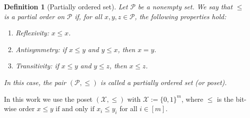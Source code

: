 \documentclass[onecolumn]{IEEEtran} %
\newcommand{\bP}{\mathbf P}
\newcommand{\bI}{\mathbf I}
\newcommand{\1}{\mathbbm{1}}
\DeclareMathOperator{\Aut}{Aut}
\theoremstyle{boldremark}
\newtheorem{definition}{Definition}
\newcommand{\bT}{\mathbf{T}}
\begin{document}


\begin{definition}[Partially ordered set]\label{Def_POSET}
Let $\mathcal{P}$ be a nonempty set. We say that $\le$ is a \emph{partial order} on $\mathcal{P}$
if, for all $x,y,z\in\mathcal{P}$, the following properties hold:
\begin{enumerate}
  \item {Reflexivity:} $x \le x$.
  \item {Antisymmetry:} if $x \le y$ and $y \le x$, then $x = y$.
  \item {Transitivity:} if $x \le y$ and $y \le z$, then $x \le z$.
\end{enumerate}
In this case, the pair $(\mathcal{P},\le)$ is called a partially ordered set
(or \emph{poset}).
\end{definition}
In this work we use the poset $(\mathcal{X},\le)$ with
$\mathcal{X} := \{0,1\}^m$, where $\le$ is the bit-wise order
$x\le y \mbox{ if and only if } x_i \le y_i$ for all $i\in[m]$.
\end{document}
